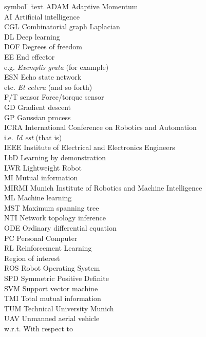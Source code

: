 \begin{tabbing}
symbol \= \hspace{1.5cm} \= text \kill
%
ADAM \> \> Adaptive Momentum \\[1.1ex]
AI \> \> Artificial intelligence \\[1.1ex]
CGL \> \> Combinatorial graph Laplacian \\[1.1ex]
DL \> \> Deep learning \\[1.1ex]
DOF \> \> Degrees of freedom \\[1.1ex]
EE \> \> End effector \\[1.1ex]
e.g. \> \> \textit{Exemplis grata} (for example) \\[1.1ex]
ESN \> \> Echo state network \\[1.1ex]
etc. \> \> \textit{Et cetera} (and so forth) \\[1.1ex]
F/T sensor \> \> Force/torque sensor \\[1.1ex]
GD \> \> Gradient descent \\[1.1ex]
GP \> \> Gaussian process \\[1.1ex]
ICRA \> \> International Conference on Robotics and Automation \\[1.1ex]
i.e. \> \> \textit{Id est} (that is) \\[1.1ex]
IEEE \> \> Institute of Electrical and Electronics Engineers \\[1.1ex]
LbD \> \> Learning by demonstration \\[1.1ex]
LWR \> \> Lightweight Robot \\[1.1ex]
MI \> \> Mutual information \\[1.1ex]
MIRMI \> \> Munich Institute of Robotics and Machine Intelligence \\[1.1ex]
ML \> \> Machine learning \\[1.1ex]
MST \> \> Maximum spanning tree \\[1.1ex]
NTI \> \> Network topology inference \\[1.1ex]
ODE \> \> Ordinary differential equation \\[1.1ex]
PC \> \> Personal Computer \\[1.1ex]
RL \> \> Reinforcement Learning \\[1.1ex]
\roi{} \> \> Region of interest \\[1.1ex]
ROS \> \> Robot Operating System \\[1.1ex]
SPD \> \> Symmetric Positive Definite \\[1.1ex]
SVM \> \> Support vector machine \\[1.1ex]
TMI \> \> Total mutual information\\[1.1ex]
TUM \> \> Technical University Munich \\[1.1ex]
UAV \> \> Unmanned aerial vehicle \\[1.1ex]
w.r.t. \> \> With respect to \\[1.1ex]
\end{tabbing}